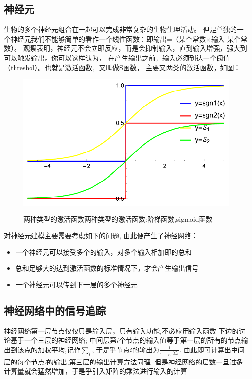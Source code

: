 \documentclass[12pt]{article}
\begin{document}
    \subsection{神经元}
    生物的多个神经元组合在一起可以完成非常复杂的生物生理活动。
    但是单独的一个神经元我们不能够简单的看作一个线性函数：即输出=（某个常数$\times$输入-某个常数）。
    观察表明，神经元不会立即反应，而是会抑制输入，直到输入增强，强大到可以触发输出。你可以这样认为，
    在产生输出之前，输入必须到达一个阈值（threshol）。也就是激活函数，又叫做S函数，
    主要又两类的激活函数，如图：
    \begin{figure}[!htb]
        \centering
        \includegraphics[scale=0.5]{./picture/激活函数.pdf}
        \label{两种类型的激活函数}
        \caption{两种类型的激活函数两种类型的激活函数:阶梯函数,sigmoid函数}
    \end{figure}

    对神经元建模主要需要考虑如下的问题, 由此便产生了神经网络：
    \begin{itemize}
        \item 一个神经元可以接受多个的输入，对多个输入相加即的总和
        \item 总和足够大的达到激活函数的标准情况下，才会产生输出信号
        \item 一个神经元可以传到下一层的多个神经元
    \end{itemize} 


    \subsection{神经网络中的信号追踪}
    神经网络第一层节点仅仅只是输入层，只有输入功能,不必应用输入函数
    下边的讨论基于一个三层的神经网络;
    中间层第$i$个节点的输入值等于第一层的所有的节点输出到该点的加权平均,记作$\sum\limits_{i}$,
    于是乎节点$i$的输出为$\frac{1}{1+e^{-\sum_i}}$.
    由此即可计算出中间层的每个节点$i$的输出,第三层的输出计算方法同理.
    但是神经网络的层数一旦过多计算量就会猛然增加，于是乎引入矩阵的乘法进行输入的计算
\end{document}
